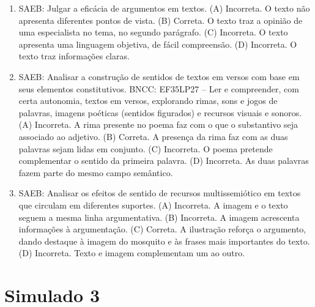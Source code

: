 \begin{enumerate}
\item
SAEB: Julgar a eficácia de argumentos em textos. 
(A) Incorreta. O texto não apresenta diferentes pontos de vista. 
(B) Correta. O texto traz a opinião de uma especialista no tema, no segundo parágrafo. 
(C) Incorreta. O texto apresenta uma linguagem objetiva, de fácil compreensão. 
(D) Incorreta. O texto traz informações claras.

\item
SAEB: Analisar a construção de sentidos de textos em versos com base em seus elementos constitutivos. BNCC: EF35LP27 -- Ler e compreender, com certa autonomia, textos em versos, explorando rimas, sons e jogos de palavras, imagens poéticas (sentidos figurados) e recursos visuais e sonoros.
(A) Incorreta. A rima presente no poema faz com o que o substantivo seja associado ao adjetivo. 
(B) Correta. A presença da rima faz com as duas palavras sejam lidas em conjunto.
(C) Incorreta. O poema pretende complementar o sentido da primeira palavra. 
(D) Incorreta. As duas palavras fazem parte do mesmo campo semântico.

\item
SAEB: Analisar os efeitos de sentido de recursos multissemiótico em textos que circulam em diferentes suportes. 
(A) Incorreta. A imagem e o texto seguem a mesma linha argumentativa. 
(B) Incorreta. A imagem acrescenta informações à argumentação. 
(C) Correta. A ilustração reforça o argumento, dando destaque à imagem do mosquito e às frases mais importantes do texto. 
(D) Incorreta. Texto e imagem complementam um ao outro.
\end{enumerate}

\section*{Simulado 3}

